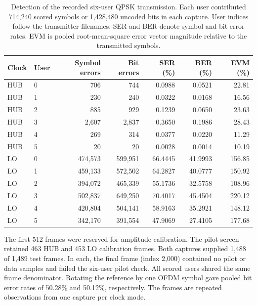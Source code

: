 \documentclass[10pt,letterpaper]{article}
\renewcommand{\thetable}{\arabic{table}}
\begin{document}
\endgroup
\FloatBarrier
\begin{table}[!htbp]\ContinuedFloat\renewcommand{\thetable}{\arabic{table}b}\centering\small
\caption{Detection of the recorded six-user QPSK transmission. Each user contributed 714,240 scored symbols or 1,428,480 uncoded bits in each capture. User indices follow the transmitter filenames. SER and BER denote symbol and bit error rates. EVM is pooled root-mean-square error vector magnitude relative to the transmitted symbols.}
\label{supp:payload}
\begin{tabular}{llrrrrr}\toprule
Clock & User & Symbol errors & Bit errors & SER (\%) & BER (\%) & EVM (\%)\\
\midrule
HUB & 0 & 706 & 744 & 0.0988 & 0.0521 & 22.81\\
HUB & 1 & 230 & 240 & 0.0322 & 0.0168 & 16.56\\
HUB & 2 & 885 & 929 & 0.1239 & 0.0650 & 23.63\\
HUB & 3 & 2,607 & 2,837 & 0.3650 & 0.1986 & 28.43\\
HUB & 4 & 269 & 314 & 0.0377 & 0.0220 & 11.29\\
HUB & 5 & 20 & 20 & 0.0028 & 0.0014 & 10.19\\
\midrule
LO & 0 & 474,573 & 599,951 & 66.4445 & 41.9993 & 156.85\\
LO & 1 & 459,133 & 572,502 & 64.2827 & 40.0777 & 150.92\\
LO & 2 & 394,072 & 465,339 & 55.1736 & 32.5758 & 108.96\\
LO & 3 & 502,837 & 649,250 & 70.4017 & 45.4504 & 220.12\\
LO & 4 & 420,804 & 504,141 & 58.9163 & 35.2921 & 148.12\\
LO & 5 & 342,170 & 391,554 & 47.9069 & 27.4105 & 177.68\\
\bottomrule\end{tabular}
\par\medskip\begin{minipage}{0.96\linewidth}\small
The first 512 frames were reserved for amplitude calibration. The pilot screen retained 463 HUB and 453 LO calibration frames. Both captures supplied 1,488 of 1,489 test frames. In each, the final frame (index 2,000) contained no pilot or data samples and failed the six-user pilot check. All scored users shared the same frame denominator. Rotating the reference by one OFDM symbol gave pooled bit error rates of 50.28\% and 50.12\%, respectively. The frames are repeated observations from one capture per clock mode.
\end{minipage}
\end{table}
\end{document}
